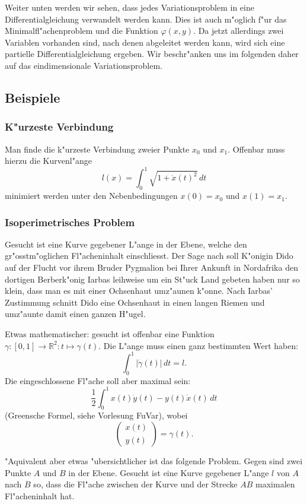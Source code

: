 Weiter unten werden wir sehen, dass jedes Variationsproblem in eine
Differentialgleichung verwandelt werden kann.
Dies ist auch m"oglich f"ur das Minimalfl"achenproblem und die 
Funktion $\varphi(x,y)$.
Da jetzt allerdings
zwei Variablen vorhanden sind, nach denen abgeleitet werden kann, wird
sich eine partielle Differentialgleichung ergeben.
Wir beschr"anken uns im folgenden daher auf das eindimensionale
Variationsproblem.

\subsection{Beispiele}
\subsubsection{K"urzeste Verbindung}
Man finde die k"urzeste Verbindung zweier Punkte $x_0$ und $x_1$.
Offenbar muss hierzu die Kurvenl"ange
\begin{equation}
l(x)=\int_0^1 \sqrt{1+\dot x(t)^2}\,dt
\label{kuerzeste-verbindung-variationsprinzip}
\end{equation}
minimiert werden unter den Nebenbedingungen $x(0)=x_0$ und
$x(1)=x_1$.

\subsubsection{Isoperimetrisches Problem}
Gesucht ist eine Kurve gegebener L"ange in der Ebene, welche den
gr"osstm"oglichen Fl"acheninhalt einschliesst.
Der Sage nach soll K"onigin Dido auf der Flucht vor ihrem Bruder
Pygmalion bei Ihrer Ankunft in Nordafrika den dortigen Berberk"onig
Iarbas leihweise um ein St"uck Land gebeten haben nur so klein, dass man es mit
einer Ochsenhaut umz"aunen k"onne. Nach Iarbas' Zustimmung schnitt
Dido eine Ochsenhaut in einen langen Riemen und umz"aunte damit einen ganzen
H"ugel.

Etwas mathematischer: gesucht ist offenbar eine Funktion
$\gamma\colon [0,1]\to\mathbb R^2:t\mapsto \gamma(t)$. Die
L"ange muss einen ganz bestimmten Wert haben:
\[
\int_0^1 |\dot\gamma(t)|\,dt = l.
\]
Die eingeschlossene Fl"ache soll aber maximal sein:
\[
\frac12\int_0^1 x(t)\dot y(t)-y(t)\dot x(t)\,dt
\]
(Greensche Formel, siehe Vorlesung FuVar), wobei
\[
\begin{pmatrix}x(t)\\y(t)\end{pmatrix}=\gamma(t).
\]

"Aquivalent aber etwas "ubersichtlicher ist das folgende Problem.
Gegen sind zwei Punkte $A$ und $B$ in der Ebene. Gesucht ist eine
Kurve gegebener L"ange $l$ von $A$ nach $B$ so, dass die Fl"ache
zwischen der Kurve und der Strecke $AB$ maximalen Fl"acheninhalt hat.


